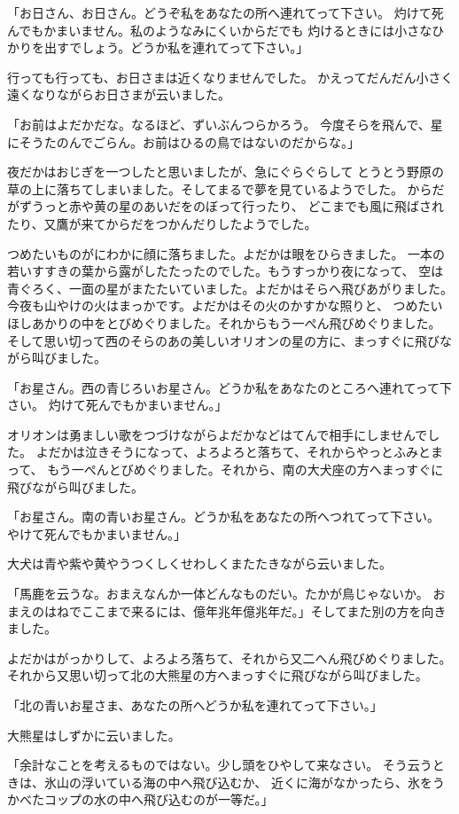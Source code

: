 \documentclass[a4paper, platex, dvipdfmx]{jsarticle}
\begin{document}
「お日さん、お日さん。どうぞ私をあなたの所へ連れてって下さい。
灼けて死んでもかまいません。私のようなみにくいからだでも
灼けるときには小さなひかりを出すでしょう。どうか私を連れてって下さい。」

行っても行っても、お日さまは近くなりませんでした。
かえってだんだん小さく遠くなりながらお日さまが云いました。

「お前はよだかだな。なるほど、ずいぶんつらかろう。
今度そらを飛んで、星にそうたのんでごらん。お前はひるの鳥ではないのだからな。」

夜だかはおじぎを一つしたと思いましたが、急にぐらぐらして
とうとう野原の草の上に落ちてしまいました。そしてまるで夢を見ているようでした。
からだがずうっと赤や黄の星のあいだをのぼって行ったり、
どこまでも風に飛ばされたり、又鷹が来てからだをつかんだりしたようでした。

つめたいものがにわかに顔に落ちました。よだかは眼をひらきました。
一本の若いすすきの葉から露がしたたったのでした。もうすっかり夜になって、
空は青ぐろく、一面の星がまたたいていました。よだかはそらへ飛びあがりました。
今夜も山やけの火はまっかです。よだかはその火のかすかな照りと、
つめたいほしあかりの中をとびめぐりました。それからもう一ぺん飛びめぐりました。
そして思い切って西のそらのあの美しいオリオンの星の方に、まっすぐに飛びながら叫びました。

「お星さん。西の青じろいお星さん。どうか私をあなたのところへ連れてって下さい。
灼けて死んでもかまいません。」

オリオンは勇ましい歌をつづけながらよだかなどはてんで相手にしませんでした。
よだかは泣きそうになって、よろよろと落ちて、それからやっとふみとまって、
もう一ぺんとびめぐりました。それから、南の大犬座の方へまっすぐに飛びながら叫びました。

「お星さん。南の青いお星さん。どうか私をあなたの所へつれてって下さい。
やけて死んでもかまいません。」

大犬は青や紫や黄やうつくしくせわしくまたたきながら云いました。

「馬鹿を云うな。おまえなんか一体どんなものだい。たかが鳥じゃないか。
おまえのはねでここまで来るには、億年兆年億兆年だ。」そしてまた別の方を向きました。

よだかはがっかりして、よろよろ落ちて、それから又二へん飛びめぐりました。
それから又思い切って北の大熊星の方へまっすぐに飛びながら叫びました。

「北の青いお星さま、あなたの所へどうか私を連れてって下さい。」

大熊星はしずかに云いました。

「余計なことを考えるものではない。少し頭をひやして来なさい。
そう云うときは、氷山の浮いている海の中へ飛び込むか、
近くに海がなかったら、氷をうかべたコップの水の中へ飛び込むのが一等だ。」
\end{document}

